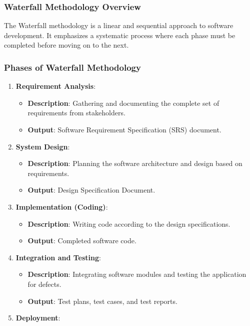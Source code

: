 \documentclass{beamer}
\begin{document}
\begin{frame}[fragile]
    \frametitle{Waterfall Methodology Overview}
    The Waterfall methodology is a linear and sequential approach to software development. It emphasizes a systematic process where each phase must be completed before moving on to the next.
\end{frame}

\begin{frame}[fragile]
    \frametitle{Phases of Waterfall Methodology}
    \begin{enumerate}
        \item \textbf{Requirement Analysis}:
            \begin{itemize}
                \item \textbf{Description}: Gathering and documenting the complete set of requirements from stakeholders.
                \item \textbf{Output}: Software Requirement Specification (SRS) document.
            \end{itemize}
        \item \textbf{System Design}:
            \begin{itemize}
                \item \textbf{Description}: Planning the software architecture and design based on requirements.
                \item \textbf{Output}: Design Specification Document.
            \end{itemize}
        \item \textbf{Implementation (Coding)}:
            \begin{itemize}
                \item \textbf{Description}: Writing code according to the design specifications.
                \item \textbf{Output}: Completed software code.
            \end{itemize}
        \item \textbf{Integration and Testing}:
            \begin{itemize}
                \item \textbf{Description}: Integrating software modules and testing the application for defects.
                \item \textbf{Output}: Test plans, test cases, and test reports.
            \end{itemize}
        \item \textbf{Deployment}:
            \begin{itemize}

\end{itemize}
\end{enumerate}
\end{frame}
\end{document}
